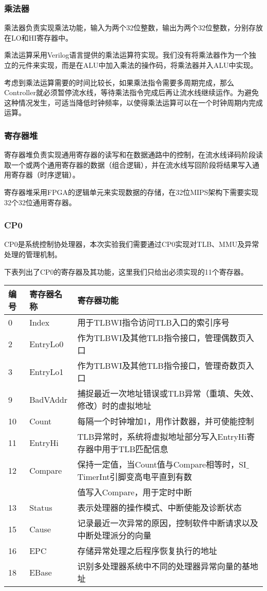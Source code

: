 \subsubsection{乘法器}
乘法器负责实现乘法功能，输入为两个32位整数，输出为两个32位整数，分别存放在LO和HI寄存器中。

乘法运算采用Verilog语言提供的乘法运算符实现。我们没有将乘法器作为一个独立的元件来实现，而是在ALU中加入乘法的操作码，将乘法器并入ALU中实现。

考虑到乘法运算需要的时间比较长，如果乘法指令需要多周期完成，那么Controller就必须暂停流水线，等待乘法指令完成后再让流水线继续运作。为避免这种情况发生，可适当降低时钟频率，以使得乘法运算可以在一个时钟周期内完成运算。

\subsubsection{寄存器堆}
寄存器堆负责实现通用寄存器的读写和在数据通路中的控制，在流水线译码阶段读取一个或两个通用寄存器的数据（组合逻辑），并在流水线写回阶段将结果写入通用寄存器（时序逻辑）。

寄存器堆采用FPGA的逻辑单元来实现数据的存储，在32位MIPS架构下需要实现32个32位通用寄存器。

\subsubsection{CP0}
CP0是系统控制协处理器，本次实验我们需要通过CP0实现对TLB、MMU及异常处理的管理机制。

下表列出了CP0的寄存器及其功能，这里我们只给出必须实现的11个寄存器。

\begin{table}[H]
\centering
\begin{tabular}{lll}
\hline
编号&寄存器名称&寄存器功能\\
\hline
0&Index&用于TLBWI指令访问TLB入口的索引序号\\
2&EntryLo0&作为TLBWI及其他TLB指令接口，管理偶数页入口\\
3&EntryLo1&作为TLBWI及其他TLB指令接口，管理奇数页入口\\
9&BadVAddr&捕捉最近一次地址错误或TLB异常（重填、失效、修改）时的虚拟地址\\
10&Count&每隔一个时钟增加1，用作计数器，并可使能控制\\
11&EntryHi&TLB异常时，系统将虚拟地址部分写入EntryHi寄存器中用于TLB匹配信息\\
12&Compare&保持一定值，当Count值与Compare相等时，SI$\_$TimerInt引脚变高电平直到有数\\
&&值写入Compare，用于定时中断\\
13&Status&表示处理器的操作模式、中断使能及诊断状态\\
15&Cause&记录最近一次异常的原因，控制软件中断请求以及中断处理派分的向量\\
16&EPC&存储异常处理之后程序恢复执行的地址\\
18&EBase&识别多处理器系统中不同的处理器异常向量的基地址\\
\hline
\end{tabular}
\end{table}

